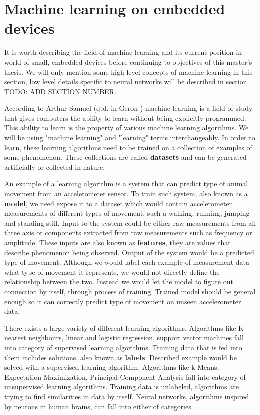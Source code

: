\section{ Machine learning on embedded devices}

It is worth describing the field of machine learning and its current position in world of small, embedded devices before continuing to objectives of this master's thesis.
We will only mention some high level concepts of machine learning in this section, low level details specific to neural networks will be described in section TODO: ADD SECTION NUMBER.

According to Arthur Samuel (qtd. in Geron \cite{geron}) machine learning is a field of study that gives computers the ability to learn without being explicitly programmed.
This ability to learn is the property of various machine learning algorithms.
We will be using "machine learning" and "learning" terms interchangeably. 
In order to learn, these learning algorithms need to be trained on a collection of examples of some phenomenon\cite{burkovml}. 
These collections are called \textbf{datasets} and can be generated artificially or collected in nature.

An example of a learning algorithm is a system that can predict type of animal movement from an accelerometer sensor.
To train such system, also known as a \textbf{model}, we need expose it to a dataset which would contain accelerometer measurements of different types of movement, such a walking, running, jumping and standing still.
Input to the system could be either raw measurements from all three axis or components extracted from raw measurements such as frequency or amplitude. 
These inputs are also known as \textbf{features}, they are values that describe phenomenon being observed\cite{burkovml}. 
Output of the system would be a predicted type of movement.
Although we would label each example of measurement data what type of movement it represents, we would not directly define the relationship between the two.
Instead we would let the model to figure out connection by itself, through process of training.
Trained model should be general enough so it can correctly predict type of movement on unseen accelerometer data.

There exists a large variety of different learning algorithms. 
Algorithms like K-nearest neighbours, linear and logistic regression, support vector machines fall into category of supervised learning algorithms.
Training data that is fed into them includes solutions, also known as \textbf{labels}\cite{geron}.
Described example would be solved with a supervised learning algorithm.
Algorithms like k-Means, Expectation Maximization, Principal Component Analysis fall into category of unsupervised learning algorithms.
Training data is unlabeled, algorithms are trying to find similarities in data by itself\cite{geron}.
Neural networks, algorithms inspired by neurons in human brains\cite{geron}\cite{cs231n}, can fall into either of categories. 





